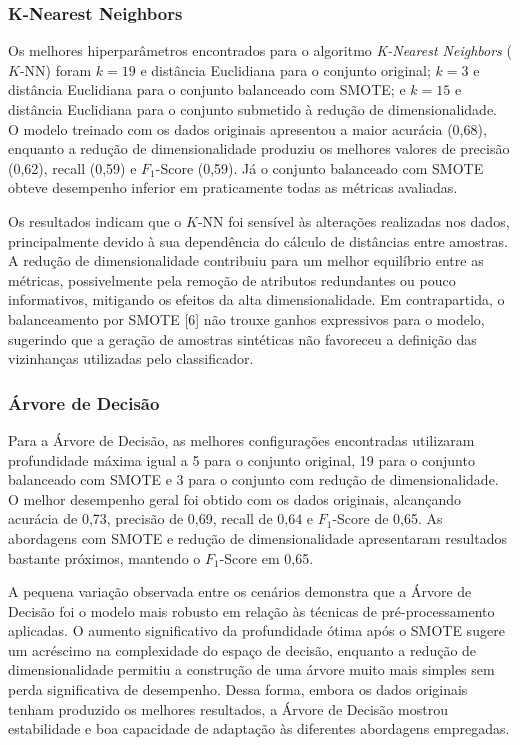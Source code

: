 \subsubsection{K-Nearest Neighbors}
Os melhores hiperparâmetros encontrados para o algoritmo \textit{K-Nearest Neighbors} ($K$-NN) foram $k=19$ e distância Euclidiana para o conjunto original; $k=3$ e distância Euclidiana para o conjunto balanceado com SMOTE; e $k=15$ e distância Euclidiana para o conjunto submetido à redução de dimensionalidade. O modelo treinado com os dados originais apresentou a maior acurácia (0,68), enquanto a redução de dimensionalidade produziu os melhores valores de precisão (0,62), recall (0,59) e $F_1$-Score (0,59). Já o conjunto balanceado com SMOTE obteve desempenho inferior em praticamente todas as métricas avaliadas.

Os resultados indicam que o $K$-NN foi sensível às alterações realizadas nos dados, principalmente devido à sua dependência do cálculo de distâncias entre amostras. A redução de dimensionalidade contribuiu para um melhor equilíbrio entre as métricas, possivelmente pela remoção de atributos redundantes ou pouco informativos, mitigando os efeitos da alta dimensionalidade. Em contrapartida, o balanceamento por SMOTE [6] não trouxe ganhos expressivos para o modelo, sugerindo que a geração de amostras sintéticas não favoreceu a definição das vizinhanças utilizadas pelo classificador.

\subsubsection{Árvore de Decisão}
Para a Árvore de Decisão, as melhores configurações encontradas utilizaram profundidade máxima igual a 5 para o conjunto original, 19 para o conjunto balanceado com SMOTE e 3 para o conjunto com redução de dimensionalidade. O melhor desempenho geral foi obtido com os dados originais, alcançando acurácia de 0,73, precisão de 0,69, recall de 0,64 e $F_1$-Score de 0,65. As abordagens com SMOTE e redução de dimensionalidade apresentaram resultados bastante próximos, mantendo o $F_1$-Score em 0,65.

A pequena variação observada entre os cenários demonstra que a Árvore de Decisão foi o modelo mais robusto em relação às técnicas de pré-processamento aplicadas. O aumento significativo da profundidade ótima após o SMOTE sugere um acréscimo na complexidade do espaço de decisão, enquanto a redução de dimensionalidade permitiu a construção de uma árvore muito mais simples sem perda significativa de desempenho. Dessa forma, embora os dados originais tenham produzido os melhores resultados, a Árvore de Decisão mostrou estabilidade e boa capacidade de adaptação às diferentes abordagens empregadas.

